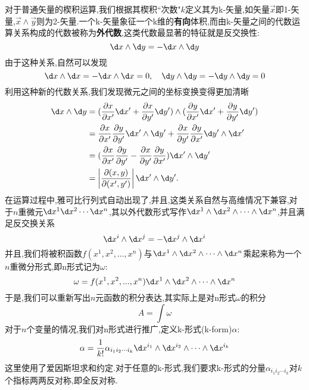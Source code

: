 对于普通矢量的楔积运算,我们根据其楔积``次数"$ k $定义其为k-矢量,如矢量$\vec x$即1-矢量,$\vec x\wedge\vec y$则为2-矢量.一个k-矢量象征一个k维的\textbf{有向}体积,而由k-矢量之间的代数运算关系构成的代数被称为\textbf{外代数},这类代数最显著的特征就是反交换性:
$$\dx\wedge\dy=-\dx\wedge\dy$$
由于这种关系,自然可以发现
$$\dx\wedge \dx=-\dx\wedge \dx=0,\quad \dy\wedge \dy=-\dy\wedge\dy=0$$
利用这种新的代数关系,我们发现微元之间的坐标变换变得更加清晰
\begin{equation}
    \begin{aligned}\dx\wedge \dy&=(\frac{\partial x}{\partial x^{\prime}}\dx^{\prime}+\frac{\partial x}{\partial y^{\prime}}\dy^{\prime})\wedge(\frac{\partial y}{\partial x^{\prime}}\dx^{\prime}+\frac{\partial y}{\partial y^{\prime}}\dy^{\prime})\\&=\frac{\partial x}{\partial x^\prime}\frac{\partial y}{\partial y^\prime}\dx^\prime\wedge \dy^\prime+\frac{\partial x}{\partial y^\prime}\frac{\partial y}{\partial x^\prime}\dy^\prime\wedge \dx^\prime\\&=(\frac{\partial x}{\partial x^\prime}\frac{\partial y}{\partial y^\prime}-\frac{\partial x}{\partial y^\prime}\frac{\partial y}{\partial x^\prime})\dx^\prime\wedge \dy^\prime\\&=\left|\frac{\partial(x,y)}{\partial(x^{\prime},y^{\prime})}\right|\dx^{\prime}\wedge \dy^{\prime}.\end{aligned}
\end{equation}
在运算过程中,雅可比行列式自动出现了,并且,这类关系自然与高维情况下兼容,对于$ n $重微元$\dx^1\dx^2\cdots\dx^n$,其以外代数形式写作$\dx^1\wedge\dx^2\wedge\cdots\wedge\dx^n$,并且满足反交换关系
$$\dx^i\wedge \dx^j=-\dx^j\wedge \dx^i$$
并且,我们将被积函数$f(x^1,x^2,...,x^n)$与$\dx^1\wedge\dx^2\wedge\cdots\wedge\dx^n$乘起来称为一个$ n $重微分形式,即n形式记为$\omega$:
\begin{equation}
    \omega=f(x^1,x^2,...,x^n)\dx^1\wedge\dx^2\wedge\cdots\wedge\dx^n
\end{equation}
于是,我们可以重新写出$ n $元函数的积分表达,其实际上是对n形式$\omega$的积分
\begin{equation}
    A=\int\omega
\end{equation}
对于$ n $个变量的情况,我们对n形式进行推广,定义k-形式(k-form)$\alpha$:
\begin{equation}
    \alpha=\frac{1}{k!}\alpha_{i_1i_2\cdots i_k}\dx^{i_1}\wedge \dx^{i_2}\wedge\cdots\wedge \dx^{i_k}
\end{equation}
这里使用了爱因斯坦求和约定.对于任意的k-形式,我们要求k-形式的分量$\alpha_{i_1i_2\cdots i_k}$对$ k $个指标两两反对称,即全反对称.

